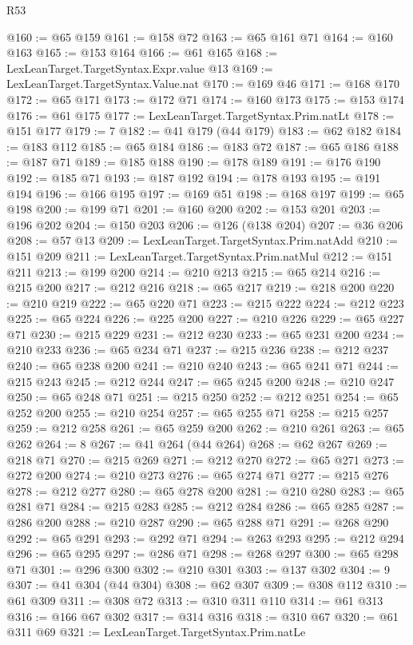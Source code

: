 \begin{lexlean}{R53}
\begin{coremodule}
@160 := @65 @159
@161 := @158 @72
@163 := @65 @161 @71
@164 := @160 @163
@165 := @153 @164
@166 := @61 @165
@168 := LexLeanTarget.TargetSyntax.Expr.value @13
@169 := LexLeanTarget.TargetSyntax.Value.nat
@170 := @169 @46
@171 := @168 @170
@172 := @65 @171
@173 := @172 @71
@174 := @160 @173
@175 := @153 @174
@176 := @61 @175
@177 := LexLeanTarget.TargetSyntax.Prim.natLt
@178 := @151 @177
@179 := 7
@182 := @41 @179 (@44 @179)
@183 := @62 @182
@184 := @183 @112
@185 := @65 @184
@186 := @183 @72
@187 := @65 @186
@188 := @187 @71
@189 := @185 @188
@190 := @178 @189
@191 := @176 @190
@192 := @185 @71
@193 := @187 @192
@194 := @178 @193
@195 := @191 @194
@196 := @166 @195
@197 := @169 @51
@198 := @168 @197
@199 := @65 @198
@200 := @199 @71
@201 := @160 @200
@202 := @153 @201
@203 := @196 @202
@204 := @150 @203
@206 := @126 (@138 @204)
@207 := @36 @206
@208 := @57 @13
@209 := LexLeanTarget.TargetSyntax.Prim.natAdd
@210 := @151 @209
@211 := LexLeanTarget.TargetSyntax.Prim.natMul
@212 := @151 @211
@213 := @199 @200
@214 := @210 @213
@215 := @65 @214
@216 := @215 @200
@217 := @212 @216
@218 := @65 @217
@219 := @218 @200
@220 := @210 @219
@222 := @65 @220 @71
@223 := @215 @222
@224 := @212 @223
@225 := @65 @224
@226 := @225 @200
@227 := @210 @226
@229 := @65 @227 @71
@230 := @215 @229
@231 := @212 @230
@233 := @65 @231 @200
@234 := @210 @233
@236 := @65 @234 @71
@237 := @215 @236
@238 := @212 @237
@240 := @65 @238 @200
@241 := @210 @240
@243 := @65 @241 @71
@244 := @215 @243
@245 := @212 @244
@247 := @65 @245 @200
@248 := @210 @247
@250 := @65 @248 @71
@251 := @215 @250
@252 := @212 @251
@254 := @65 @252 @200
@255 := @210 @254
@257 := @65 @255 @71
@258 := @215 @257
@259 := @212 @258
@261 := @65 @259 @200
@262 := @210 @261
@263 := @65 @262
@264 := 8
@267 := @41 @264 (@44 @264)
@268 := @62 @267
@269 := @218 @71
@270 := @215 @269
@271 := @212 @270
@272 := @65 @271
@273 := @272 @200
@274 := @210 @273
@276 := @65 @274 @71
@277 := @215 @276
@278 := @212 @277
@280 := @65 @278 @200
@281 := @210 @280
@283 := @65 @281 @71
@284 := @215 @283
@285 := @212 @284
@286 := @65 @285
@287 := @286 @200
@288 := @210 @287
@290 := @65 @288 @71
@291 := @268 @290
@292 := @65 @291
@293 := @292 @71
@294 := @263 @293
@295 := @212 @294
@296 := @65 @295
@297 := @286 @71
@298 := @268 @297
@300 := @65 @298 @71
@301 := @296 @300
@302 := @210 @301
@303 := @137 @302
@304 := 9
@307 := @41 @304 (@44 @304)
@308 := @62 @307
@309 := @308 @112
@310 := @61 @309
@311 := @308 @72
@313 := @310 @311 @110
@314 := @61 @313
@316 := @166 @67 @302
@317 := @314 @316
@318 := @310 @67
@320 := @61 @311 @69
@321 := LexLeanTarget.TargetSyntax.Prim.natLe

\end{coremodule}
\end{lexlean}
